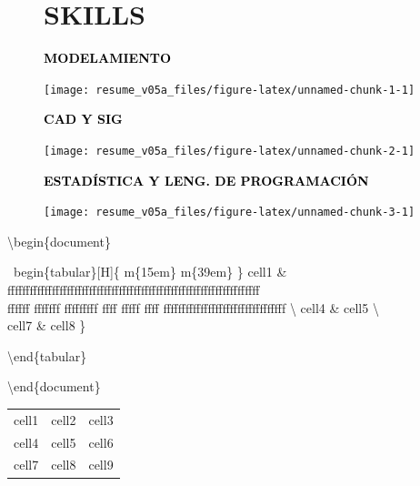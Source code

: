 \documentclass[
  10pt,
]{article}
\begin{document}
\begin{figure}[tph]
\begin{minipage}[t]{0.65\textwidth}
\section{SKILLS\vspace{-0.35em}}

\textcolor{black}{\textbf{MODELAMIENTO}}


\begin{center}\texttt{[image: resume\_v05a\_files/figure-latex/unnamed-chunk-1-1]} \end{center}

\textcolor{black}{\textbf{CAD Y SIG}}


\begin{center}\texttt{[image: resume\_v05a\_files/figure-latex/unnamed-chunk-2-1]} \end{center}

\textcolor{black}{\textbf{ESTADÍSTICA Y LENG. DE PROGRAMACIÓN}}

\begin{center}\texttt{[image: resume\_v05a\_files/figure-latex/unnamed-chunk-3-1]} \end{center}

  \end{minipage}
\end{figure}

\pagebreak

\textbackslash begin\{document\} \newpage \centering

~begin\{tabular\}{[}H{]}\{ m\{15em\} \textbar{} m\{39em\} \textbar{} \}
cell1 \&
ffffffffffffffffffffffffffffffffffffffffffffffffffffffffffffffffffff\\
ffffff fffffff fffffffff ffff fffff ffff
fffffffffffffffffffffffffffffffff \textbackslash{} cell4 \& cell5
\textbackslash{}\\
cell7 \& cell8 \}

\textbackslash end\{tabular\}

\textbackslash end\{document\}

\newpage
\centering
  \begin{tabular}{ c c c }
  
 cell1 & cell2 & cell3 \\ 
 cell4 & cell5 & cell6 \\  
 cell7 & cell8 & cell9   
 
 
  \end{tabular}
\end{document}
